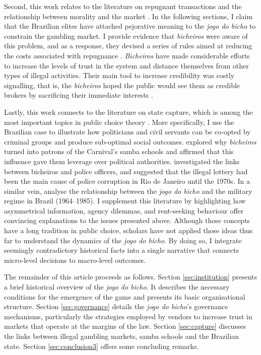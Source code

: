 Second, this work relates to the literature on repugnant transactions and the relationship between morality and the market \citep{boettke1995morality, roth2007repugnance, sandel2012money, satz2010some, simmel1900geldes, zelizer1979morals}. In the following sections, I claim that the Brazilian elites have attached pejorative meaning to the \emph{jogo do bicho} to constrain the gambling market. I provide evidence that \emph{bicheiros} were aware of this problem, and as a response, they devised a series of rules aimed at reducing the costs associated with repugnance \citep{labronici2014sorteio, magalhaes2005ganhou}. \emph{Bicheiros} have made considerable efforts to increase the levels of trust in the system and distance themselves from other types of illegal activities. Their main tool to increase credibility was costly signalling, that is, the \emph{bicheiros} hoped the public would see them as credible brokers by sacrificing their immediate interests  \citep{gambetta2009codes,kimbrough2015commitment, schelling1960strategy}.

Lastly, this work connects to the literature on state capture, which is among the most important topics in public choice theory \citep{hellman2003seize, rose1978corruption, rose1999corruption, shleifer2002grabbing, tollison1982rent}. More specifically, I use the Brazilian case to illustrate how politicians and civil servants can be co-opted by criminal groups and produce sub-optimal social outcomes. \citet{queiroz1992carnaval} explored why \emph{bicheiros} turned into patrons of the Carnival's samba schools and affirmed that this influence gave them leverage over political authorities. \citet{misse2007illegal} investigated the links between bicheiros and police officers, and suggested that the illegal lottery had been the main cause of police corruption in Rio de Janeiro until the 1970s. In a similar vein, \citet{jupiara2015poroes} analyse the relationship between the \emph{jogo do bicho} and the military regime in Brazil (1964--1985). I supplement this literature by highlighting how asymmetrical information, agency dilemmas, and rent-seeking behaviour offer convincing explanations to the issues presented above. Although those concepts have a long tradition in public choice, scholars have not applied those ideas thus far to understand the dynamics of the \emph{jogo do bicho}. By doing so, I integrate seemingly contradictory historical facts into a single narrative that connects micro-level decisions to macro-level outcomes.

The remainder of this article proceeds as follows. Section \ref{sec:institution} presents a brief historical overview of the \emph{jogo do bicho}. It describes the necessary conditions for the emergence of the game and presents its basic organisational structure. Section \ref{sec:governance} details the \emph{jogo do bicho}'s governance mechanisms, particularly the strategies employed by vendors to increase trust in markets that operate at the margins of the law. Section \ref{sec:capture} discusses the links between illegal gambling markets, samba schools and the Brazilian state. Section \ref{sec:conclusion3} offers some concluding remarks.


